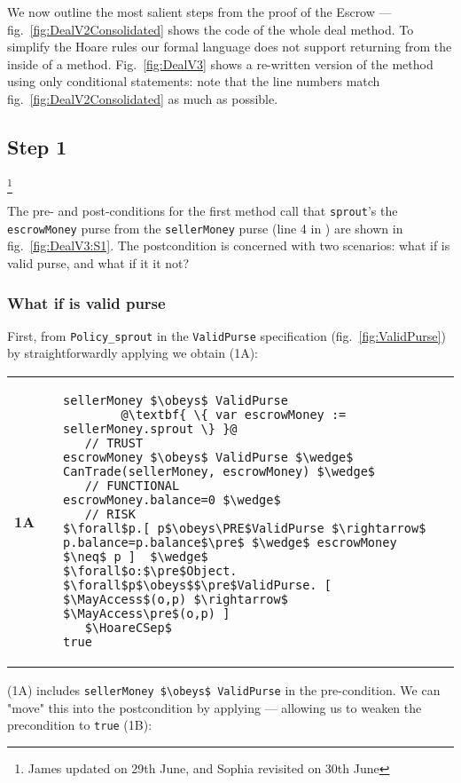 \cleardoublepage
\newpage

We now outline the most salient steps from the proof of the
Escrow --- fig.~\ref{fig:DealV2Consolidated} shows the code of the
whole deal method.
To simplify the Hoare rules our formal language does not support
returning from the inside of a method. Fig.~\ref{fig:DealV3}
shows a re-written version of the method using only conditional
statements: note that the line numbers match
fig.~\ref{fig:DealV2Consolidated} as much as possible.

\subsection{Step 1}\footnote{James updated on 29th June, and Sophia revisited on 30th June}

The pre- and post-conditions for the first method call that
\lstinline+sprout+'s the \lstinline+escrowMoney+ purse from the
\lstinline+sellerMoney+ purse (line 4 in
\bothfigs) are shown in fig.~\ref{fig:DealV3:S1}.
The postcondition is concerned with two scenarios: what if  is valid purse, and what if it it not?



\subsubsection{What if  is valid purse}

First, from \lstinline+Policy_sprout+ in the \lstinline+ValidPurse+
specification (fig.~\ref{fig:ValidPurse}) by straightforwardly
applying  we obtain (1A):

\begin{tabular}{lll}
{\bf 1A} & &
\begin{lstlisting}[escapechar=@]
sellerMoney $\obeys$ ValidPurse
        @\textbf{ \{ var escrowMoney := sellerMoney.sprout \} }@
   // TRUST
escrowMoney $\obeys$ ValidPurse $\wedge$ CanTrade(sellerMoney, escrowMoney) $\wedge$
   // FUNCTIONAL
escrowMoney.balance=0 $\wedge$
   // RISK
$\forall$p.[ p$\obeys\PRE$ValidPurse $\rightarrow$ p.balance=p.balance$\pre$ $\wedge$ escrowMoney $\neq$ p ]  $\wedge$
$\forall$o:$\pre$Object. $\forall$p$\obeys$$\pre$ValidPurse. [ $\MayAccess$(o,p) $\rightarrow$ $\MayAccess\pre$(o,p) ]  
   $\HoareCSep$
true
\end{lstlisting}
\end{tabular}

\noindent (1A) includes \lstinline+sellerMoney $\obeys$ ValidPurse+ in
the pre-condition.  We can "move" this into the postcondition by
applying  ---  allowing us to weaken the precondition
to \lstinline+true+ (1B):
 

